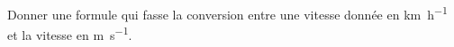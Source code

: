
\begin{exercice}\label{exosmath-0497}

    Donner une formule qui fasse la conversion entre une vitesse donnée en \si{\kilo\meter\per\hour} et la vitesse en \si{\meter\per\second}.

\end{exercice}
